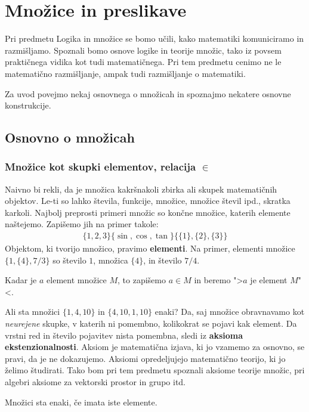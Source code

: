 \chapter{Množice in preslikave}

Pri predmetu Logika in množice se bomo učili, kako matematiki komuniciramo in razmišljamo. Spoznali bomo osnove logike
in teorije množic, tako iz povsem praktičnega vidika kot tudi matematičnega. Pri tem predmetu cenimo ne le matematično
razmišljanje, ampak tudi razmišljanje o matematiki.

Za uvod povejmo nekaj osnovnega o množicah in spoznajmo nekatere osnovne konstrukcije.

\section{Osnovno o množicah}

\subsection{Množice kot skupki elementov, relacija $\in$}

Naivno bi rekli, da je množica kakršnakoli zbirka ali skupek matematičnih objektov. Le-ti so lahko števila, funkcije,
množice, množice števil ipd., skratka karkoli.
%
Najbolj preprosti primeri množic so končne množice, katerih elemente naštejemo. Zapišemo jih na primer takole:
%
\begin{gather*}
  \{1, 2, 3\}
  \{\sin, \cos, \tan\}
  \{\{1\}, \{2\}, \{3\}\}
\end{gather*}
%
Objektom, ki tvorijo množico, pravimo \textbf{elementi}. Na primer, elementi množice $\{1, \{4\}, 7/3\}$ so število $1$, množica $\{4\}$, in število $7/4$.

Kadar je $a$ element množice $M$, to zapišemo $a \in M$ in beremo ">$a$ je element $M$"<.

Ali sta množici $\{1, 4, 10\}$ in $\{4, 10, 1, 10\}$ enaki? Da, saj množice obravnavamo kot \emph{neurejene} skupke, v katerih ni pomembno, kolikokrat se pojavi kak element. Da vrstni red in število pojavitev nista pomembna, sledi iz \textbf{aksioma
ekstenzionalnosti}. Aksiom je matematična izjava, ki jo vzamemo za osnovno, se pravi, da je ne dokazujemo. Aksiomi opredeljujejo matematično teorijo, ki jo želimo študirati. Tako bom pri tem predmetu spoznali aksiome teorije množic, pri algebri aksiome za vektorski prostor in grupo itd.

\begin{aksiom}
  Množici sta enaki, če imata iste elemente.
\end{aksiom}

